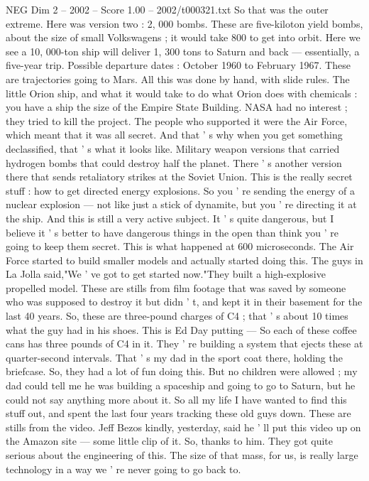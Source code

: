 \begin{textsample}{NEG Dim 2 – 2002 – Score 1.00 – 2002/t000321.txt}
So that was the outer extreme.
Here was version two : 2, 000 bombs.
These are five-kiloton yield bombs, about the size of small Volkswagens ; it would take 800 to get into orbit.
Here we see a 10, 000-ton ship will deliver 1, 300 tons to Saturn and back — essentially, a five-year trip.
Possible departure dates : October 1960 to February 1967.
These are trajectories going to Mars.
All this was done by hand, with slide rules.
The little Orion ship, and what it would take to do what Orion does with chemicals : you have a ship the size of the Empire State Building.
NASA had no interest ; they tried to kill the project.
The people who supported it were the Air Force, which meant that it was all secret.
And that ' s why when you get something declassified, that ' s what it looks like.
Military weapon versions that carried hydrogen bombs that could destroy half the planet.
There ' s another version there that sends retaliatory strikes at the Soviet Union.
This is the really secret stuff : how to get directed energy explosions.
So you ' re sending the energy of a nuclear explosion — not like just a stick of dynamite, but you ' re directing it at the ship.
And this is still a very active subject.
It ' s quite dangerous, but I believe it ' s better to have dangerous things in the open than think you ' re going to keep them secret.
This is what happened at 600 microseconds.
The Air Force started to build smaller models and actually started doing this.
The guys in La Jolla said,"We ' ve got to get started now."They built a high-explosive propelled model.
These are stills from film footage that was saved by someone who was supposed to destroy it but didn ' t, and kept it in their basement for the last 40 years.
So, these are three-pound charges of C4 ; that ' s about 10 times what the guy had in his shoes.
This is Ed Day putting — So each of these coffee cans has three pounds of C4 in it.
They ' re building a system that ejects these at quarter-second intervals.
That ' s my dad in the sport coat there, holding the briefcase.
So, they had a lot of fun doing this.
But no children were allowed ; my dad could tell me he was building a spaceship and going to go to Saturn, but he could not say anything more about it.
So all my life I have wanted to find this stuff out, and spent the last four years tracking these old guys down.
These are stills from the video.
Jeff Bezos kindly, yesterday, said he ' ll put this video up on the Amazon site — some little clip of it.
So, thanks to him.
They got quite serious about the engineering of this.
The size of that mass, for us, is really large technology in a way we ' re never going to go back to.

\end{textsample}

